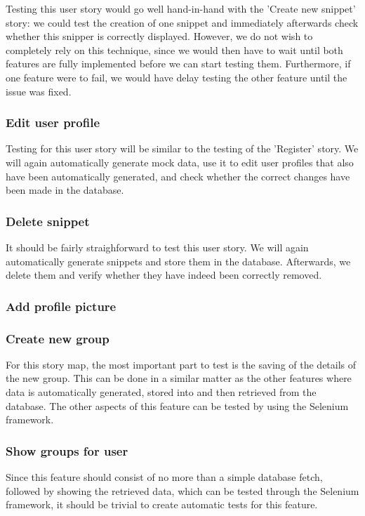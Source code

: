 \documentclass[10pt,a4paper,BCOR12mm, headexclude, footexclude,
  twoside, openright]{scrartcl} \usepackage[scaled]{helvet}
\numberwithin{equation}{section} %
\numberwithin{figure}{section} %
\numberwithin{table}{section} %
\begin{document}
Testing this user story would go well hand-in-hand with the 'Create new snippet'
story: we could test the creation of one snippet and immediately afterwards
check whether this snipper is correctly displayed.  However, we do not wish to
completely rely on this technique, since we would then have to wait until both
features are fully implemented before we can start testing them. Furthermore, if
one feature were to fail, we would have delay testing the other feature until
the issue was fixed.

\subsubsection*{Edit user profile}
Testing for this user story will be similar to the testing of the 'Register'
story. We will again automatically generate mock data, use it to edit user
profiles that also have been automatically generated, and check whether the
correct changes have been made in the database.

\subsubsection*{Delete snippet}
It should be fairly straighforward to test this user story. We will again
automatically generate snippets and store them in the database. Afterwards, we
delete them and verify whether they have indeed been correctly removed.

\subsubsection*{Add profile picture}

\subsubsection*{Create new group}
For this story map, the most important part to test is the saving of the details
of the new group. This can be done in a similar matter as the other features
where data is automatically generated, stored into and then retrieved from the
database.  The other aspects of this feature can be tested by using the Selenium
framework.

\subsubsection*{Show groups for user}
Since this feature should consist of no more than a simple database fetch,
followed by showing the retrieved data, which can be tested through the Selenium
framework, it should be trivial to create automatic tests for this feature.
\end{document}
